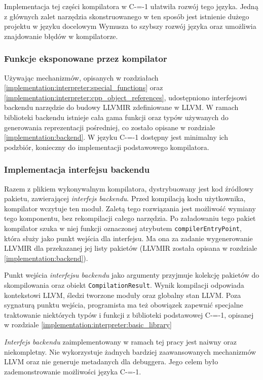 Implementacja tej części kompilatora w C-=-1 ułatwiła rozwój tego języka.
Jedną z głównych zalet narzędzia skonstruowanego w ten sposób jest istnienie dużego projektu w języku docelowym
Wymusza to szybszy rozwój języka oraz umożliwia znajdowanie błędów w kompilatorze.

\subsubsection{Funkcje eksponowane przez kompilator}

Używając mechanizmów, opisanych w rozdziałach \ref{implementation:interpreter:special_functions} oraz \ref{implementation:interpreter:cpp_object_references}, udostępniono interfejsowi backendu narzędzie do budowy LLVMIR zdefiniowane w LLVM.
W ramach biblioteki backendu istnieje cała gama funkcji oraz typów używanych do generowania reprezentacji pośredniej, co zostało opisane w rozdziale \ref{implementation:backend}.
W języku C-=-1 dostępny jest minimalny ich podzbiór, konieczny do implementacji podstawowego kompilatora.

\subsubsection{Implementacja interfejsu backendu}

Razem z plikiem wykonywalnym kompilatora, dystrybuowany jest kod źródłowy pakietu, zawierającej \emph{interfejs backendu}. 
Przed kompilacją kodu użytkownika, kompilator wczytuje ten moduł.
Zaletą tego rozwiązania jest możliwość wymiany tego komponentu, bez rekompilacji całego narzędzia.
Po załadowaniu tego pakiet kompilator szuka w niej funkcji oznaczonej atrybutem \lstinline{compilerEntryPoint}, która służy jako punkt wejścia dla interfejsu. 
Ma ona za zadanie wygenerowanie LLVMIR dla przekazanej jej listy pakietów (LLVMIR została opisana w rozdziale \ref{implementation:backend}).

Punkt wejścia \emph{interfejsu backendu} jako argumenty przyjmuje kolekcję pakietów do skompilowania oraz obiekt \lstinline{CompilationResult}.
Wynik kompilacji odpowiada kontekstowi LLVM, śledzi tworzone moduły oraz globalny stan LLVM.
Poza sygnaturą punktu wejścia, programista ma też obowiązek zapewnić specjalne traktowanie niektórych typów i funkcji z biblioteki podstawowej C-=-1, opisanej w rozdziale \ref{implementation:interpreter:basic_library}

\emph{Interfejs backendu} zaimplementowany w ramach tej pracy jest naiwny oraz niekompletny.
Nie wykorzystuje żadnych bardziej zaawansowanych mechanizmów LLVM oraz nie generuje metadanych dla debuggera.
Jego celem było zademonstrowanie możliwości języka C-=-1.

